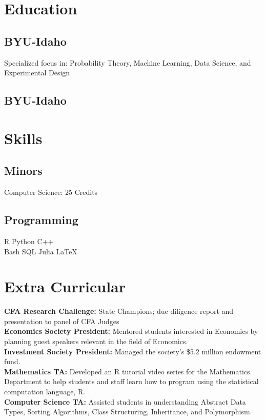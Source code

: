 \documentclass[letterpaper]{deedy-resume}
\begin{document}
\begin{minipage}[t]{0.31\textwidth}
\section{Education} 

\subsection{BYU-Idaho}
\vspace{.02cm}
Specialized focus in:
Probability Theory, Machine Learning,
Data Science, and Experimental Design
\sectionspace

\subsection{BYU-Idaho}
\vspace{.02cm}

\section{Skills}
\subsection{Minors}
\textbullet{} Computer Science: 25 Credits \\

\sectionspace

\subsection{Programming}
\textbullet{} R \textbullet{} Python \textbullet{} C++ \\
\textbullet{} Bash \textbullet{} SQL \textbullet{} Julia \textbullet{} \LaTeX{} \\ 

\sectionspace

\section{Extra Curricular}
\textbf{CFA Research Challenge:} State Champions; due diligence 
report and presentation to panel of CFA Judges \\
\sectionspace
\textbf{Economics Society President:} Mentored students
interested in Economics by planning guest speakers relevant in the
field of Economics.\\
\sectionspace
\textbf{Investment Society President:} Managed the
society's \$5.2 million endowment fund.\\
\sectionspace
\textbf{Mathematics TA:} Developed an R tutorial video series for the
Mathematics Department to help students and staff learn
how to program using the statistical computation language, R.\\
\sectionspace
\textbf{Computer Science TA:} Assisted students in understanding
Abstract Data Types, Sorting Algorithms, Class Structuring,
Inheritance, and Polymorphism.


\end{minipage}
\end{document}
